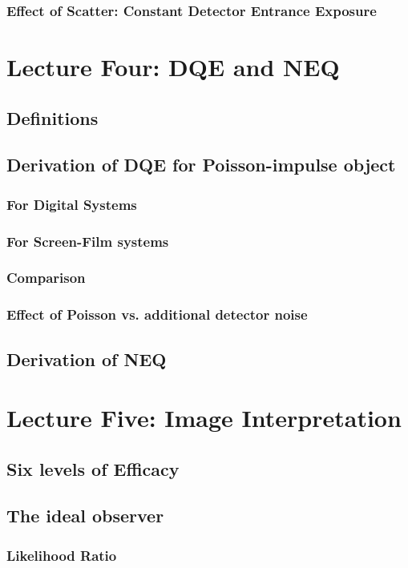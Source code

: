 \documentclass[11pt]{article}
\begin{document}
\subsubsection{Effect of Scatter: Constant Detector Entrance Exposure}

\newpage
\section{Lecture Four: DQE and NEQ}
\subsection{Definitions}
\subsection{Derivation of DQE for Poisson-impulse object}
\subsubsection{For Digital Systems}
\subsubsection{For Screen-Film systems}
\subsubsection{Comparison}
\subsubsection{Effect of Poisson vs. additional detector noise}
\subsection{Derivation of NEQ}


\newpage
\section{Lecture Five: Image Interpretation}
\subsection{Six levels of Efficacy}
\subsection{The ideal observer}
\subsubsection{Likelihood Ratio}
\end{document}
